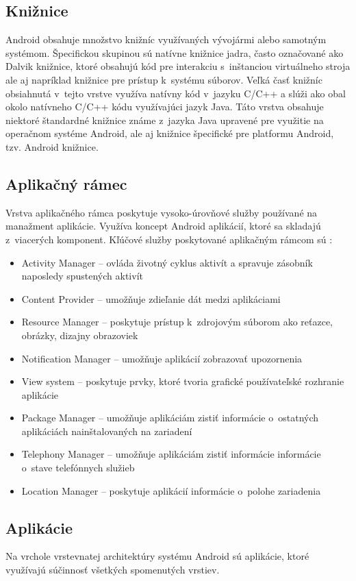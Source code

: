 \subsection{Knižnice}
Android obsahuje množstvo knižníc využívaných vývojármi alebo samotným systémom. Špecifickou skupinou sú natívne knižnice jadra, často označované ako Dalvik knižnice, ktoré obsahujú kód pre interakciu s~inštanciou virtuálneho stroja ale aj napríklad knižnice pre prístup k~systému súborov. Veľká časť knižníc obsiahnutá v~tejto vrstve využíva natívny kód v~jazyku C/C++ a slúži ako obal okolo natívneho C/C++ kódu využívajúci jazyk Java. Táto vrstva obsahuje niektoré štandardné knižnice známe z~jazyka Java upravené pre využitie na operačnom systéme Android, ale aj knižnice špecifické pre platformu Android, tzv. Android knižnice.
\subsection{Aplikačný rámec}
Vrstva aplikačného rámca poskytuje vysoko-úrovňové služby používané na manažment aplikácie. Využíva koncept Android aplikácií, ktoré sa skladajú z~viacerých komponent. Kľúčové služby poskytované aplikačným rámcom sú : 
\begin{itemize}
	\item Activity Manager  --  ovláda životný cyklus aktivít a spravuje zásobník naposledy spustených aktivít
	\item Content Provider  --  umožňuje zdieľanie dát medzi aplikáciami
	\item Resource Manager  --  poskytuje prístup k~zdrojovým súborom ako reťazce, obrázky, dizajny obrazoviek
	\item Notification Manager  --  umožňuje aplikácií zobrazovať upozornenia
	\item View system  --  poskytuje prvky, ktoré tvoria grafické používateľské rozhranie aplikácie
	\item Package Manager  --  umožňuje aplikáciám zistiť informácie o~ostatných aplikáciách nainštalovaných na zariadení
	\item Telephony Manager  --  umožňuje aplikáciám zistiť informácie informácie o~stave telefónnych služieb
	\item Location Manager  --  poskytuje aplikácií informácie o~polohe zariadenia
\end{itemize}
\subsection{Aplikácie}
Na vrchole vrstevnatej architektúry systému Android sú aplikácie, ktoré využívajú súčinnosť všetkých spomenutých vrstiev. 

